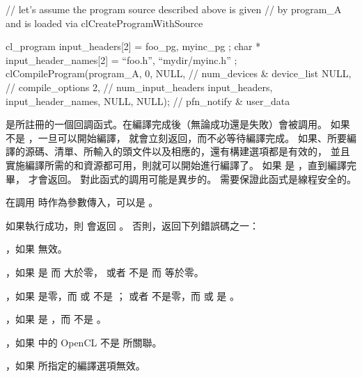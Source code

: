 // let’s assume the program source described above is given
// by program_A and is loaded via clCreateProgramWithSource

cl_program input_headers[2] = { foo_pg, myinc_pg };
char * input_header_names[2] = { “foo.h”, “mydir/myinc.h” };
clCompileProgram(program_A,
		0, NULL,	// num_devices & device_list
		NULL,		// compile_options
		2,		// num_input_headers
		input_headers,
		input_header_names,
		NULL, NULL);	// pfn_notify & user_data
\stopclc

 是所註冊的一個回調函式。在編譯完成後（無論成功還是失敗）會被調用。
如果  不是 ，一旦可以開始編譯，  就會立刻返回，而不必等待編譯完成。
如果、所要編譯的源碼、清單、所輸入的頭文件以及相應的，還有構建選項都是有效的，
並且實施編譯所需的和資源都可用，則就可以開始進行編譯了。
如果  是 ，直到編譯完畢，  才會返回。
對此函式的調用可能是異步的。
需要保證此函式是線程安全的。

 在調用  時作為參數傳入，可以是 。

如果執行成功，則  會返回 。
否則，返回下列錯誤碼之一：
\startigBase
\item {}，如果  無效。

\item {}，如果  是  而  大於零，
或者  不是  而  等於零。

\item {}，如果  是零，而  或  不是 ；
或者  不是零，而  或  是 。

\item {}，如果  是 ，而  不是 。

\item {}，如果  中的 OpenCL  不是  所關聯。

\item {}，如果  所指定的編譯選項無效。

